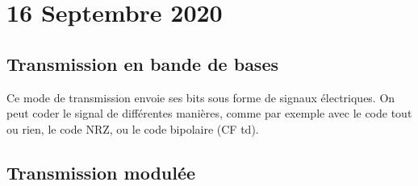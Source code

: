 \section{16 Septembre 2020}

\subsection{Transmission en bande de bases}

Ce mode de transmission envoie ses bits sous forme de signaux électriques. On peut coder le signal de différentes manières, comme par exemple avec le code tout ou rien, le code NRZ, ou le code bipolaire (CF td).

\subsection{Transmission modulée}




